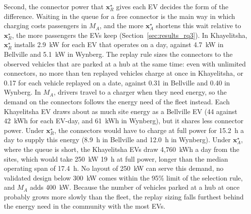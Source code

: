 \documentclass{elsarticle}
\newcommand{\MA}{\ensuremath{M_A}}
\newcommand{\xR}{\ensuremath{\mathbf{x}_R^{\star}}}
\newcommand{\xA}{\ensuremath{\mathbf{x}_A^{\star}}}
\begin{document}
Second, the connector power that \xR{} gives each EV decides the form of the difference. Waiting in the queue for a free connector is the main way in which charging costs passengers in \MA, and the more \xA{} shortens this wait relative to \xR, the more passengers the EVs keep (Section~\ref{sec:results_rq3}). In Khayelitsha, \xR{} installs 2.9~kW for each EV that operates on a day, against 4.7~kW in Bellville and 5.1~kW in Wynberg. The replay rule sizes the connectors to the observed vehicles that are parked at a hub at the same time: even with unlimited connectors, no more than ten replayed vehicles charge at once in Khayelitsha, or 0.17 for each vehicle replayed on a date, against 0.31 in Bellville and 0.40 in Wynberg. In \MA, drivers travel to a charger when they need energy, so the demand on the connectors follows the energy need of the fleet instead. Each Khayelitsha EV draws about as much site energy as a Bellville EV (44 against 42~kWh for each EV-day, and 61~kWh in Wynberg), but it shares less connector power. Under \xR, the connectors would have to charge at full power for 15.2~h a day to supply this energy (8.9~h in Bellville and 12.0~h in Wynberg). Under \xA, where the queue is short, the Khayelitsha EVs draw 4,760~kWh a day from the sites, which would take 250~kW 19~h at full power, longer than the median operating span of 17.4~h. No layout of 250~kW can serve this demand, no validated design below 300~kW comes within the 95\% limit of the selection rule, and \MA{} adds 400~kW. Because the number of vehicles parked at a hub at once probably grows more slowly than the fleet, the replay sizing falls furthest behind the energy need in the community with the most EVs.
\end{document}
